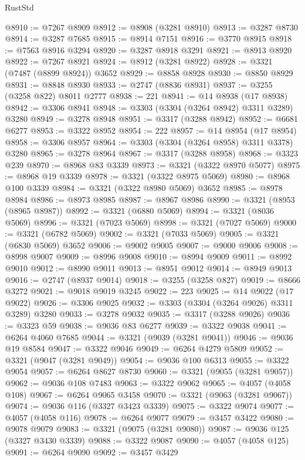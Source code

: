 \begin{lexlean}{RustStd}
\begin{coremodule}
{\begin{coremodule}
{{{{{{{{{{{{{{{{{{{{{{{{{{{{{{{{{@8910 := @7267 @8909
@8912 := @8908 (@3281 @8910)
@8913 := @3287 @8730
@8914 := @3287 @7685
@8915 := @8914 @7151
@8916 := @3770 @8915
@8918 := @7563 @8916 @3294
@8920 := @3287 @8918 @3291
@8921 := @8913 @8920
@8922 := @7267 @8921
@8924 := @8912 (@3281 @8922)
@8928 := @3321 (@7487 (@8899 @8924)) @3652
@8929 := @8858 @8928
@8930 := @8850 @8929
@8931 := @8848 @8930
@8933 := @2747 (@8836 @8931)
@8937 := @3255 (@3258 @822) @8011 @2777
@8938 := 221
@8941 := @14 @8938 (@17 @8938)
@8942 := @3306 @8941
@8948 := @3303 (@3304 (@3264 @8942) @3311 @3289) @3280
@8949 := @3278 @8948
@8951 := @3317 (@3288 @8942)
@8952 := @6681 @6277
@8953 := @3322 @8952
@8954 := 222
@8957 := @14 @8954 (@17 @8954)
@8958 := @3306 @8957
@8964 := @3303 (@3304 (@3264 @8958) @3311 @3378) @3280
@8965 := @3278 @8964
@8967 := @3317 (@3288 @8958)
@8968 := @3323 @239
@8970 := @8968 @83 @3339
@8973 := @3321 (@3322 @8970 @5077)
@8975 := @8968 @19 @3339
@8978 := @3321 (@3322 @8975 @5069)
@8980 := @8968 @100 @3339
@8984 := @3321 (@3322 @8980 @5069) @3652
@8985 := @8978 @8984
@8986 := @8973 @8985
@8987 := @8967 @8986
@8990 := @3321 (@8953 (@8965 @8987))
@8992 := @3321 (@6880 @5069)
@8994 := @3321 (@8036 @5069)
@8996 := @3321 (@7023 @5069)
@8998 := @3321 (@7027 @5069)
@9000 := @3321 (@6782 @5069)
@9002 := @3321 (@7033 @5069)
@9005 := @3321 (@6830 @5069) @3652
@9006 := @9002 @9005
@9007 := @9000 @9006
@9008 := @8998 @9007
@9009 := @8996 @9008
@9010 := @8994 @9009
@9011 := @8992 @9010
@9012 := @8990 @9011
@9013 := @8951 @9012
@9014 := @8949 @9013
@9016 := @2747 (@8937 @9014)
@9018 := @3255 (@3258 @827)
@9019 := @8666 @3272
@9021 := @9018 @9019 @3245
@9022 := 223
@9025 := @14 @9022 (@17 @9022)
@9026 := @3306 @9025
@9032 := @3303 (@3304 (@3264 @9026) @3311 @3289) @3280
@9033 := @3278 @9032
@9035 := @3317 (@3288 @9026)
@9036 := @3323 @59
@9038 := @9036 @83 @6277
@9039 := @3322 @9038
@9041 := @6264 @4060 @7685
@9044 := @3321 (@9039 (@3281 @9041))
@9046 := @9036 @19 @8584
@9047 := @3322 @9046
@9049 := @6264 @4279 @5809
@9052 := @3321 (@9047 (@3281 @9049))
@9054 := @9036 @100 @6313
@9055 := @3322 @9054
@9057 := @6264 @8627 @8730
@9060 := @3321 (@9055 (@3281 @9057))
@9062 := @9036 @108 @7483
@9063 := @3322 @9062
@9065 := @4057 (@4058 @108)
@9067 := @6264 @9065 @3458
@9070 := @3321 (@9063 (@3281 @9067))
@9074 := @9036 @116 (@3327 @3423 @3339)
@9075 := @3322 @9074
@9077 := @4057 (@4058 @116)
@9078 := @6264 @9077
@9079 := @3457 @3422
@9080 := @9078 @9079
@9083 := @3321 (@9075 (@3281 @9080))
@9087 := @9036 @125 (@3327 @3430 @3339)
@9088 := @3322 @9087
@9090 := @4057 (@4058 @125)
@9091 := @6264 @9090
@9092 := @3457 @3429
}}}}}}}}}}}}}}}}}}}}}}}}}}}}}}}}}
\end{coremodule}}
\end{coremodule}
\end{lexlean}
